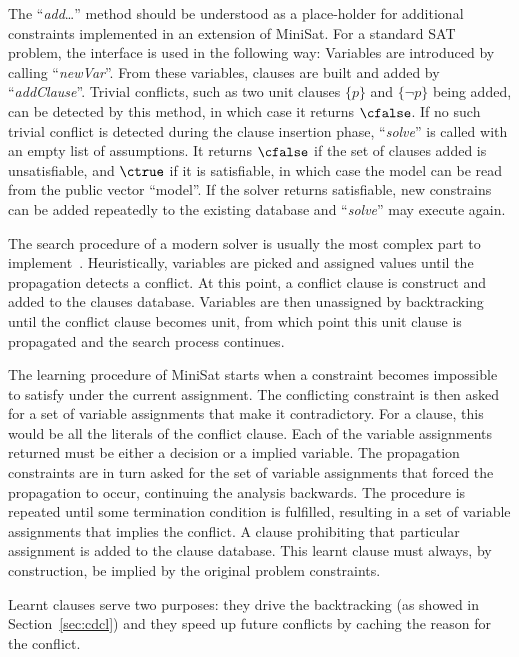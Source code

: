 The ``\textit{add}\ldots'' method should be understood as a place-holder for
additional constraints implemented in an extension of MiniSat. For a standard
SAT problem, the interface is used in the following way: Variables are
introduced by calling ``\textit{newVar}''. From these variables, clauses are
built and added by ``\textit{addClause}''.  Trivial conflicts, such as two unit
clauses $\{p\}$ and $\{\neg p\}$ being added, can be detected by this method, in
which case it returns $\cfalse$. If no such trivial conflict is detected during
the clause insertion phase, ``\textit{solve}'' is called with an empty list of
assumptions. It returns $\cfalse$ if the set of clauses added is unsatisfiable,
and $\ctrue$ if it is satisfiable, in which case the model can be read from the
public vector ``model''.  If the solver returns satisfiable, new constrains can
be added repeatedly to the existing database and ``\textit{solve}'' may execute again. 

The search procedure of a modern solver is usually the most complex part to
implement~\cite{een2003extensible}. Heuristically, variables are picked and
assigned values until the propagation detects a conflict. At this point, a
conflict clause is construct and added to the clauses database. Variables are
then unassigned by backtracking until the conflict clause becomes unit, from
which point this unit clause is propagated and the search process continues.

The learning procedure of MiniSat starts when a constraint becomes impossible to
satisfy under the current assignment. The conflicting constraint is then asked
for a set of variable assignments that make it contradictory. For a clause, this
would be all the literals of the conflict clause. Each of the variable
assignments returned must be either a decision or a implied variable. The
propagation constraints are in turn asked for the set of variable assignments
that forced the propagation to occur, continuing the analysis backwards. The
procedure is repeated until some termination condition is fulfilled, resulting
in a set of variable assignments that implies the conflict. A clause prohibiting
that particular assignment is added to the clause database. This learnt clause
must always, by construction, be implied by the original problem constraints.

Learnt clauses serve two purposes: they drive the backtracking (as showed in
Section~\ref{sec:cdcl}) and they speed up future conflicts by caching the reason
for the conflict. 

